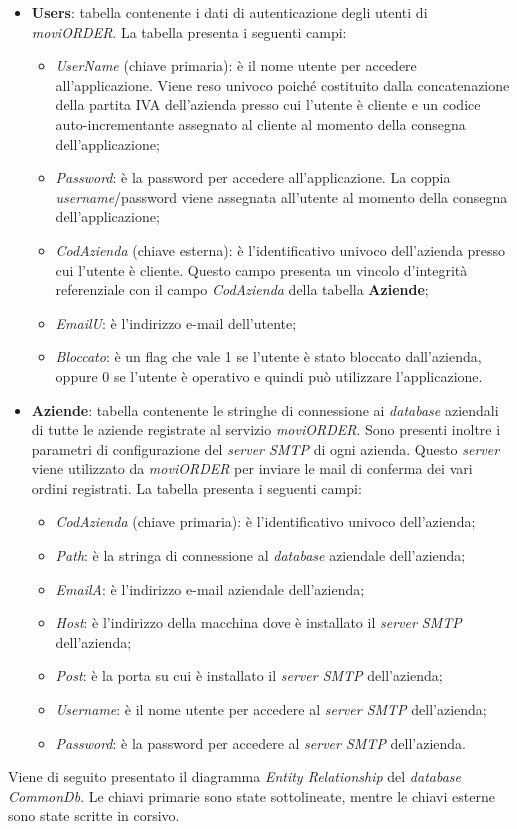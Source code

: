 \begin{itemize}
	\item \textbf{Users}: tabella contenente i dati di autenticazione degli utenti di \textit{moviORDER}. La tabella presenta i seguenti campi:
		\begin{itemize}
			\item \textit{UserName} (chiave primaria): è il nome utente per accedere all'applicazione. Viene reso univoco poiché costituito dalla concatenazione della partita IVA dell'azienda presso cui l'utente è cliente e un codice auto-incrementante assegnato al cliente al momento della consegna dell'applicazione;
			\item \textit{Password}: è la password per accedere all'applicazione. La coppia \textit{username}/password viene assegnata all'utente al momento della consegna dell'applicazione;
			\item \textit{CodAzienda} (chiave esterna): è l'identificativo univoco dell'azienda presso cui l'utente è cliente. Questo campo presenta un vincolo d'integrità referenziale con il campo \textit{CodAzienda} della tabella \textbf{Aziende};
			\item \textit{EmailU}: è l'indirizzo e-mail dell'utente;
			\item \textit{Bloccato}: è un flag che vale 1 se l'utente è stato bloccato dall'azienda, oppure 0 se l'utente è operativo e quindi può utilizzare l'applicazione.
		\end{itemize}
	\item \textbf{Aziende}: tabella contenente le stringhe di connessione ai \textit{database} aziendali di tutte le aziende registrate al servizio \textit{moviORDER}. Sono presenti inoltre i parametri di configurazione del \textit{server SMTP} di ogni azienda. Questo \textit{server} viene utilizzato da \textit{moviORDER} per inviare le mail di conferma dei vari ordini registrati. La tabella presenta i seguenti campi:
	\begin{itemize}
		\item \textit{CodAzienda} (chiave primaria): è l'identificativo univoco dell'azienda;
		\item \textit{Path}: è la stringa di connessione al \textit{database} aziendale dell'azienda;
		\item \textit{EmailA}: è l'indirizzo e-mail aziendale dell'azienda;
		\item \textit{Host}: è l'indirizzo della macchina dove è installato il \textit{server SMTP} dell'azienda;
		\item \textit{Post}: è la porta su cui è installato il \textit{server SMTP} dell'azienda;
		\item \textit{Username}: è il nome utente per accedere al \textit{server SMTP} dell'azienda;
		\item \textit{Password}: è la password per accedere al \textit{server SMTP} dell'azienda.
	\end{itemize}
\end{itemize}
Viene di seguito presentato il diagramma \textit{Entity Relationship} del \textit{database} \textit{CommonDb}. Le chiavi primarie sono state sottolineate, mentre le chiavi esterne sono state scritte in corsivo.

